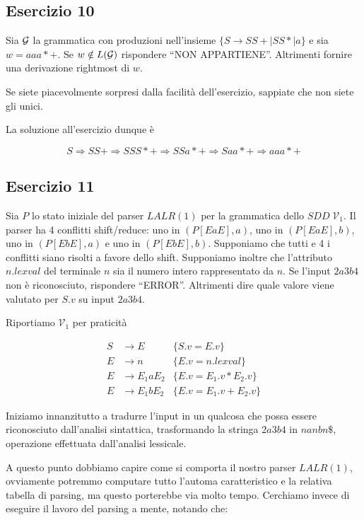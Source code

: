 \documentclass[class=book, crop=false, oneside, 12pt]{standalone}
\begin{document}
\subsection{Esercizio 10}

Sia \(\mathcal{G}\) la grammatica con produzioni nell'insieme \(\{S \to SS+ \mid SS* \mid a\}\) e sia \(w=aaa*+\).  Se \(w \notin L(\mathcal{G})\) rispondere “NON APPARTIENE”. Altrimenti fornire una derivazione rightmost di \(w\).

Se siete piacevolmente sorpresi dalla facilità dell'esercizio, sappiate che non siete gli unici. 

La soluzione all'esercizio dunque è

\begin{equation}
    S \Rightarrow SS+ \Rightarrow S SS* + \Rightarrow  SSa*+ \Rightarrow  Saa*+ \Rightarrow  aaa*+
\end{equation}

\subsection{Esercizio 11}

Sia \(P\) lo  stato  iniziale  del  parser  \(LALR(1)\)  per  la  grammatica  dello  \(SDD \; \mathcal{V}_1\). Il parser ha 4  conflitti shift/reduce:  uno in \((P[EaE],a)\), uno in \((P[EaE],b)\), uno in \((P[EbE],a)\) e uno in \((P[EbE],b)\).  Supponiamo  che  tutti  e  4  i  conflitti  siano  risolti  a  favore  dello  shift.   Supponiamo  inoltre  che  l’attributo \(n.lexval\) del terminale \(n\) sia il numero intero rappresentato da \(n\).  Se l'input \(2a3b4\) non è riconosciuto, rispondere “ERROR”. Altrimenti dire quale valore viene valutato per \(S.v\) su input \(2a3b4\).

Riportiamo \(\mathcal{V}_1\) per praticità

\begin{align*}
    S &\to E &\{S.v = E.v\} \\
    E &\to n &\{E.v = n.lexval\} \\
    E &\to E_1 a E_2 &\{E.v = E_1.v * E_2.v\} \\
    E &\to E_1 b E_2 &\{E.v = E_1.v + E_2.v\} 
\end{align*}

Iniziamo innanzitutto a tradurre l'input in un qualcosa che possa essere riconosciuto dall'analisi sintattica, trasformando la stringa \(2a3b4\) in \(nanbn\$\), operazione effettuata dall'analisi lessicale.

A questo punto dobbiamo capire come si comporta il nostro parser \(LALR(1)\), ovviamente potremmo computare tutto l'automa caratteristico e la relativa tabella di parsing, ma questo porterebbe via molto tempo. Cerchiamo invece di eseguire il lavoro del parsing a mente, notando che:
\end{document}
